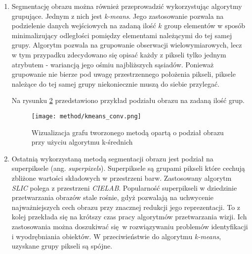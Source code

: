 {{{\begin{enumerate}
                Rysunek \ref{fig:method-vis-window} przedstawia wizualizację podziału obrazu powyższą metodą.

                \begin{figure}
                    \centering
                    \texttt{[image: method/window\_conv.png]}
                    \caption{Wizualizacja grafu tworzonego metodą opartą o podział obrazu na nie nachodzące prostokąty}
                    \label{fig:method-vis-window}
                \end{figure}

                \item Segmentację obrazu można również przeprowadzić wykorzystując algorytmy grupujące. Jednym z nich
                jest \textit{k-means}. Jego zastosowanie pozwala na podzielenie danych wejściowych na zadaną ilość $k$
                group elementów w sposób minimalizujący odległości pomiędzy elementami należącymi do tej samej
                grupy\cite{MacQueen1967SomeMF}. Algorytm pozwala na grupowanie obserwacji wielowymiarowych, lecz w tym
                przypadku zdecydowano się opisać każdy z pikseli tylko jednym atrybutem - wariancją jego ośmiu
                najbliższych sąsiadów. Ponieważ grupowanie nie bierze pod uwagę przestrzennego położenia pikseli,
                piksele należące do tej samej grupy niekoniecznie muszą do siebie przylegać.

                Na rysunku \ref{fig:method-vis-kmeans} przedstawiono przykład podziału obrazu na zadaną ilość grup.

                \begin{figure}
                    \centering
                    \texttt{[image: method/kmeans\_conv.png]}
                    \caption{Wizualizacja grafu tworzonego metodą opartą o podział obrazu przy użyciu algorytmu k-średnich}
                    \label{fig:method-vis-kmeans}
                \end{figure}

                \item Ostatnią wykorzystaną metodą segmentacji obrazu jest podział na superpiksele (ang.
                \textit{superpixels}). Superpiksele są grupami pikseli które cechują zbliżone wartości składowych w
                przestrzeni barw. Zastosowany algorytm \textit{SLIC} polega z przestrzeni
                \textit{CIELAB}\cite{Achanta2012SLICSC}. Popularność superpikseli w dziedzinie przetwarzania obrazów
                stale rośnie, gdyż pozwalają na uchwycenie najważniejszych cech obrazu przy znacznej redukcji jego
                reprezentacji. To z kolej przekłada się na krótszy czas pracy algorytmów przetwarzania wizji. Ich
                zastosowania można doszukiwać się w rozwiązywaniu problemów identyfikacji i wyodrębniania obiektów. W
                przeciwieństwie do algorytmu \textit{k-means}, uzyskane grupy pikseli są spójne.


\end{enumerate}}}}

